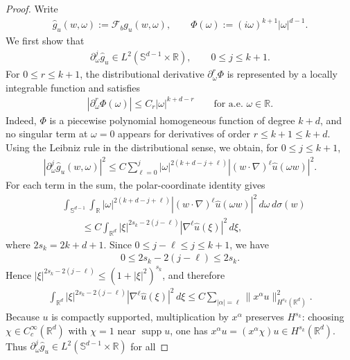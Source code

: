\documentclass[12pt]{article}
\numberwithin{equation}{section}
\numberwithin{figure}{section}
\numberwithin{equation}{section}
\newcommand{\R}{\mathbb{R}}
\newcommand{\Sph}{\mathbb S}
\begin{document}
\begin{proof}
Write
\begin{align*}
    \widehat g_u(w,\omega):=\mathcal F_b g_u(w,\omega),
    \qquad
    \Phi(\omega):=(i\omega)^{k+1}|\omega|^{d-1}.
\end{align*}
We first show that
\begin{align*}
    \partial_\omega^j \widehat g_u\in L^2(\Sph^{d-1}\times\R),
    \qquad 0\le j\le k+1.
\end{align*}
For $0\le r\le k+1$, the distributional derivative
$\partial_\omega^r\Phi$ is represented by a locally integrable function and satisfies
\begin{align*}
    |\partial_\omega^r\Phi(\omega)|
    \le C_r |\omega|^{k+d-r}
    \qquad\text{for a.e. }\omega\in\R .
\end{align*}
Indeed, $\Phi$ is a piecewise polynomial homogeneous function of degree $k+d$, and
no singular term at $\omega=0$ appears for derivatives of order $r\le k+1\le k+d$.
Using the Leibniz rule in the distributional sense, we obtain, for $0\le j\le k+1$,
\begin{align*}
    |\partial_\omega^j \widehat g_u(w,\omega)|^2
    \le C
    \sum_{\ell=0}^j
    |\omega|^{2(k+d-j+\ell)}
    |(w\cdot\nabla)^\ell \widehat u(\omega w)|^2 .
\end{align*}
For each term in the sum, the polar-coordinate identity gives
\begin{align*}
    &\int_{\Sph^{d-1}}\int_\R
    |\omega|^{2(k+d-j+\ell)}
    |(w\cdot\nabla)^\ell \widehat u(\omega w)|^2
    \,d\omega\,d\sigma(w)  \nonumber\\
    &\qquad\le
    C\int_{\R^d}
    |\xi|^{2s_k-2(j-\ell)}
    |\nabla^\ell \widehat u(\xi)|^2\,d\xi ,
\end{align*}
where $2s_k=2k+d+1$. Since $0\le j-\ell\le j\le k+1$, we have
\begin{align*}
    0\le 2s_k-2(j-\ell)\le 2s_k .
\end{align*}
Hence $|\xi|^{2s_k-2(j-\ell)} \le (1+|\xi|^2)^{s_k}$, and therefore
\begin{align*}
    \int_{\R^d}
    |\xi|^{2s_k-2(j-\ell)}
    |\nabla^\ell \widehat u(\xi)|^2\,d\xi
    \le
    C\sum_{|\alpha|=\ell}
    \|x^\alpha u\|_{H^{s_k}(\R^d)}^2 .
\end{align*}
Because $u$ is compactly supported, multiplication by $x^\alpha$ preserves
$H^{s_k}$: choosing $\chi\in C_c^\infty(\R^d)$ with $\chi=1$ near
$\operatorname{supp}u$, one has $x^\alpha u=(x^\alpha\chi)u\in H^{s_k}(\R^d)$.
Thus $\partial_\omega^j\widehat g_u\in L^2(\Sph^{d-1}\times\R)$ for all

\end{proof}
\end{document}

